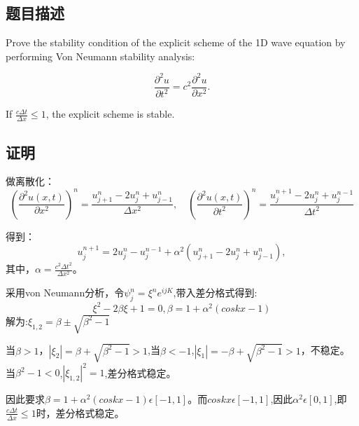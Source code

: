 \documentclass[11pt]{article}
\begin{document}
\subsection{题目描述}
Prove the stability condition of the explicit scheme of the 1D wave equation by performing Von Neumann stability analysis:

\[
\frac{\partial^2 u}{\partial t^2} = c^2 \frac{\partial^2 u}{\partial x^2}.
\]

If \( \frac{c \Delta t}{\Delta x} \leq 1 \), the explicit scheme is stable.

\subsection{证明}
做离散化：
\[
\left(\frac{\partial^2 u(x, t)}{\partial x^2}\right)^n = \frac{u_{j+1}^n - 2u_j^n + u_{j-1}^n}{\Delta x^2},
\quad
\left(\frac{\partial^2 u(x, t)}{\partial t^2}\right)^n = \frac{u_j^{n+1} - 2u_j^n + u_j^{n-1}}{\Delta t^2}
\]

得到：
\[
u_j^{n+1} = 2u_j^n - u_j^{n-1} + \alpha^2 \left( u_{j+1}^n - 2u_j^n + u_{j-1}^n \right),
\]
其中，\(\alpha = \frac{c^2 \Delta t^2}{\Delta x^2}\)。


采用von Neumann分析，令$\psi_j^n=\xi^n e^{i j K}$,带入差分格式得到:
\[\xi^2-2 \beta  \xi +1=0,\beta=1+\alpha^2(coskx-1)\]
解为:$\xi_{1,2}=\beta \pm \sqrt{\beta^2-1}$

当$\beta>1$，$|\xi_2|=\beta+\sqrt{\beta^2-1}>1$,当$\beta<-1$,$|\xi_1|=-\beta+\sqrt{\beta^2-1}>1$，不稳定。当$\beta^2-1<0$,$|\xi_{1,2}|^2=1$,差分格式稳定。

因此要求$\beta=1+\alpha^2(coskx-1) \epsilon [-1,1]$。而$coskx \epsilon [-1,1]$,因此$\alpha^2 \epsilon [0,1]$,即$\frac{c \Delta t}{\Delta x} \leq 1$时，差分格式稳定。
\end{document}
